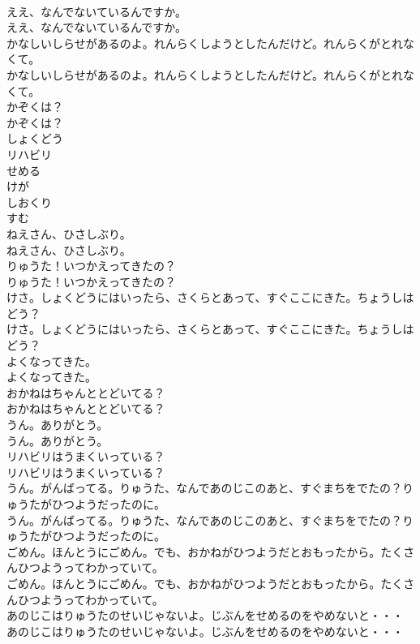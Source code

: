 \documentclass[8pt]{extreport}
\begin{document}
\begin{CJK}{UTF8}{min}
\\	ええ、なんでないているんですか。	
\\	ええ、なんでないているんですか。 
\\	かなしいしらせがあるのよ。れんらくしようとしたんだけど。れんらくがとれなくて。	
\\	かなしいしらせがあるのよ。れんらくしようとしたんだけど。れんらくがとれなくて。 
\\	かぞくは？	
\\	かぞくは？ 
\\	しょくどう
\\	リハビリ
\\	せめる
\\	けが
\\	しおくり
\\	すむ
\\	ねえさん、ひさしぶり。	
\\	ねえさん、ひさしぶり。 
\\	りゅうた！いつかえってきたの？	
\\	りゅうた！いつかえってきたの？ 
\\	けさ。しょくどうにはいったら、さくらとあって、すぐここにきた。ちょうしはどう？	
\\	けさ。しょくどうにはいったら、さくらとあって、すぐここにきた。ちょうしはどう？ 
\\	よくなってきた。	
\\	よくなってきた。 
\\	おかねはちゃんととどいてる？	
\\	おかねはちゃんととどいてる？ 
\\	うん。ありがとう。	
\\	うん。ありがとう。 
\\	リハビリはうまくいっている？	
\\	リハビリはうまくいっている？ 
\\	うん。がんばってる。りゅうた、なんであのじこのあと、すぐまちをでたの？りゅうたがひつようだったのに。	
\\	うん。がんばってる。りゅうた、なんであのじこのあと、すぐまちをでたの？りゅうたがひつようだったのに。 
\\	ごめん。ほんとうにごめん。でも、おかねがひつようだとおもったから。たくさんひつようってわかっていて。	
\\	ごめん。ほんとうにごめん。でも、おかねがひつようだとおもったから。たくさんひつようってわかっていて。 
\\	あのじこはりゅうたのせいじゃないよ。じぶんをせめるのをやめないと・・・	
\\	あのじこはりゅうたのせいじゃないよ。じぶんをせめるのをやめないと・・・ 

\end{CJK}
\end{document}
